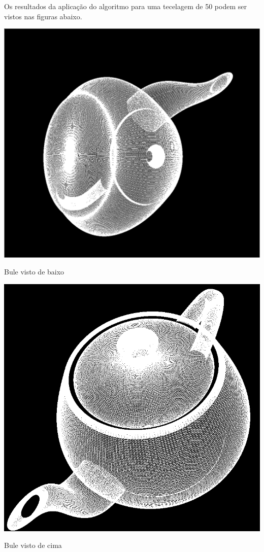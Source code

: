Os resultados da aplicação do algoritmo para uma tecelagem de 50 podem ser
vistos nas figuras abaixo.

\begin{center}	
 	\includegraphics[width=\textwidth,height=\textheight,keepaspectratio]{resources/teapotBaixo.png}
 	\captionsetup{type=figure, width=0.8\linewidth}
	\caption{Bule visto de baixo}
\label{fig:teapotbottom} 
\end{center}

\begin{center}	
 	\includegraphics[width=\textwidth,height=\textheight,keepaspectratio]{resources/teapotCima.png}
 	\captionsetup{type=figure, width=0.8\linewidth}
	\caption{Bule visto de cima}
\label{fig:teapotabove} 
\end{center}


